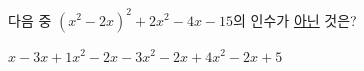 다음 중 $(x^2-2x)^2+2x^2-4x-15$의 인수가 \underline{아닌} 것은?
\begin{choices32}{$x-3$}{$x+1$}{$x^2-2x-3$}{$x^2-2x+4$}{$x^2-2x+5$}\end{choices32}
